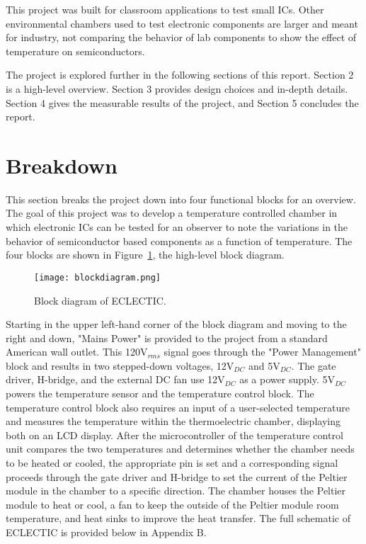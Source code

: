 \documentclass[11pt,letter]{article}
\begin{document}
This project was built for classroom applications to test small ICs. Other environmental chambers used to test electronic components are larger and meant for industry, not comparing the behavior of lab components to show the effect of temperature on semiconductors. 

The project is explored further in the following sections of this report. Section 2 is a high-level overview. Section 3 provides design choices and in-depth details. Section 4 gives the measurable results of the project, and Section 5 concludes the report.
\section{Breakdown} %
This section breaks the project down into four functional blocks for an overview. The goal of this project was to develop a temperature controlled chamber in which electronic ICs can be tested for an observer to note the variations in the behavior of semiconductor based components as a function of temperature. The four blocks are shown in Figure~\ref{fig:blockdiagram}, the high-level block diagram.

\begin{figure}[H]
    \centering
    \texttt{[image: blockdiagram.png]}
    \caption{Block diagram of ECLECTIC.}
    \label{fig:blockdiagram}
\end{figure}

Starting in the upper left-hand corner of the block diagram and moving to the right and down, "Mains Power" is provided to the project from a standard American wall outlet. This 120V$_{rms}$ signal goes through the "Power Management" block and results in two stepped-down voltages, 12V$_{DC}$ and 5V$_{DC}$. The gate driver, H-bridge, and the external DC fan use 12V$_{DC}$ as a power supply. 5V$_{DC}$ powers the temperature sensor and the temperature control block. The temperature control block also requires an input of a user-selected temperature and measures the temperature within the thermoelectric chamber, displaying both on an LCD display. After the microcontroller of the temperature control unit compares the two temperatures and determines whether the chamber needs to be heated or cooled, the appropriate pin is set and a corresponding signal proceeds through the gate driver and H-bridge to set the current of the Peltier module in the chamber to a specific direction. The chamber houses the Peltier module to heat or cool, a fan to keep the outside of the Peltier module room temperature, and heat sinks to improve the heat transfer. The full schematic of ECLECTIC is provided below in Appendix B.
\end{document}
